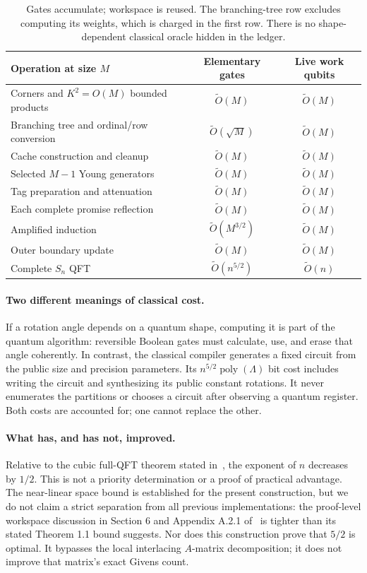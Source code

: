 \documentclass[11pt]{article}
\theoremstyle{definition}
\newcommand{\poly}{\operatorname{poly}}
\newcommand{\softO}{\widetilde O}
\begin{document}
\begin{table}[htbp]
\centering\small
\begin{tabularx}{\textwidth}{@{}Xcc@{}}
\toprule
Operation at size $M$ & Elementary gates & Live work qubits\\
\midrule
Corners and $K^2=O(M)$ bounded products & $\softO(M)$ & $\softO(M)$\\
Branching tree and ordinal/row conversion & $\softO(\sqrt M)$ & $\softO(M)$\\
Cache construction and cleanup & $\softO(M)$ & $\softO(M)$\\
Selected $M-1$ Young generators & $\softO(M)$ & $\softO(M)$\\
Tag preparation and attenuation & $\softO(M)$ & $\softO(M)$\\
Each complete promise reflection & $\softO(M)$ & $\softO(M)$\\
Amplified induction & $\softO(M^{3/2})$ & $\softO(M)$\\
Outer boundary update & $\softO(M)$ & $\softO(M)$\\
\midrule
Complete $S_n$ QFT & $\softO(n^{5/2})$ & $\softO(n)$\\
\bottomrule
\end{tabularx}
\caption{Gates accumulate; workspace is reused. The branching-tree row
excludes computing its weights, which is charged in the first row.
There is no shape-dependent classical oracle hidden in the ledger.}
\label{tab:ledger}
\end{table}

\paragraph{Two different meanings of classical cost.}
If a rotation angle depends on a quantum shape, computing it is part of
the quantum algorithm: reversible Boolean gates must calculate, use,
and erase that angle coherently. In contrast, the classical compiler
generates a fixed circuit from the public size and precision parameters.
Its $n^{5/2}\poly(\Lambda)$ bit cost includes writing the circuit and
synthesizing its public constant rotations. It never enumerates the
partitions or chooses a circuit after observing a quantum register.
Both costs are accounted for; one cannot replace the other.

\paragraph{What has, and has not, improved.}
Relative to the cubic full-QFT theorem stated in~\cite{bgo}, the exponent
of $n$ decreases by $1/2$. This is not a priority determination or a proof
of practical advantage. The near-linear space bound is established for
the present construction, but we do not claim a strict separation from
all previous implementations: the proof-level workspace discussion in
Section 6 and Appendix A.2.1 of~\cite{bgo} is tighter than its stated
Theorem 1.1 bound suggests. Nor does this construction prove that $5/2$
is optimal. It bypasses the local interlacing $A$-matrix decomposition;
it does not improve that matrix's exact Givens count.
\end{document}
